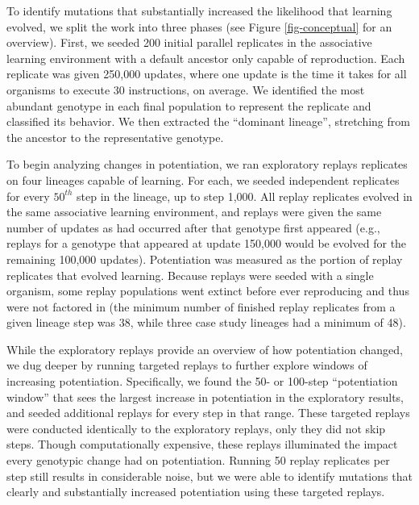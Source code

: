 To identify mutations that substantially increased the likelihood that learning evolved, we split the work into three phases (see Figure \ref{fig-conceptual} for an overview).
%
First, we seeded 200 initial parallel replicates in the associative learning environment with a default ancestor only capable of reproduction. 
Each replicate was given 250,000 updates, where one update is the time it takes for all organisms to execute 30 instructions, on average. 
We identified the most abundant genotype in each final population to represent the replicate and classified its behavior. 
We then extracted the ``dominant lineage'', stretching from the ancestor to the representative genotype. 

To begin analyzing changes in potentiation, we ran exploratory replays replicates on four lineages capable of learning.
For each, we seeded independent replicates for every $50^{th}$ step in the lineage, up to step 1,000.
All replay replicates evolved in the same associative learning environment, and replays were given the same number of updates as had %
occurred after that genotype first appeared (e.g., replays for a genotype that appeared at update 150,000 would be evolved for the remaining 100,000 updates). 
Potentiation was measured as the portion of replay replicates that evolved learning. %
Because replays were seeded with a single organism, some replay populations went extinct before ever reproducing and thus were not factored in (the minimum number of finished replay replicates from a given lineage step was 38, while three case study lineages had a minimum of 48). 

While the exploratory replays provide an overview of how potentiation changed, we dug deeper by running targeted replays to further explore windows of increasing potentiation.
Specifically, we found the 50- or 100-step ``potentiation window'' that sees the largest increase in potentiation in the exploratory results, and seeded additional replays for every step in that range.
These targeted replays were conducted identically to the exploratory replays, only they did not skip steps.
Though computationally expensive, these replays illuminated the impact every genotypic change had on potentiation. 
Running 50 replay replicates per step still results in considerable noise, but we were able to identify mutations that clearly and substantially increased potentiation using these targeted replays.

